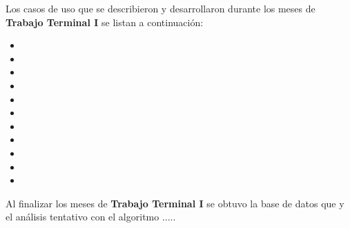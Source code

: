     Los casos de uso que se describieron y desarrollaron durante los meses de \textbf{Trabajo Terminal I} se listan a continuación:
    \begin{itemize}
        \item {}
        \item {}
        \item {}
        \item {}
        \item {}
        \item {}
        \item {}
        \item {} 
        \item {} 
        \item {}
        \item {}
    \end{itemize} 

    Al finalizar los meses de \textbf{Trabajo Terminal I}  se obtuvo la base de datos que  y el análisis tentativo con el algoritmo .....